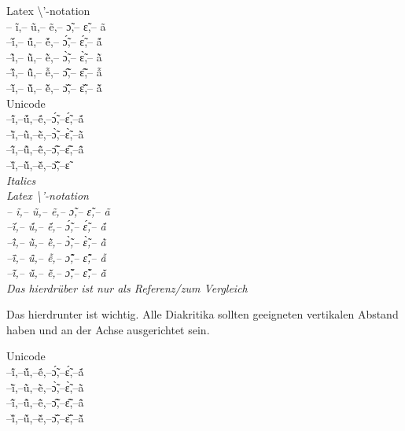Latex \textbackslash{}'-notation\\
\noindent
-- ĩ,-- ũ,-- ẽ,-- ɔ̃,-- ɛ̃,-- ã\\
--\'{ĩ},-- \'{ũ},-- \'{ẽ},-- \'{ɔ̃},-- \'{ɛ̃},-- \'{ã}\\
--\`{ĩ},-- \`{ũ},-- \`{ẽ},-- \`{ɔ̃},-- \`{ɛ̃},-- \`{ã}\\
--\^{ĩ},-- \^{ũ},-- \^{ẽ},-- \^{ɔ̃},-- \^{ɛ̃},-- \^{ã}\\
--\v{ĩ},-- \v{ũ},-- \v{ẽ},-- \v{ɔ̃},-- \v{ɛ̃},-- \v{ã}\\
%
Unicode\\
--ĩ́,--ṹ,--ẽ́,--ɔ̃́,--ɛ̃́,--ã́\\
--ĩ̀,--ũ̀,--ẽ̀,--ɔ̃̀,--ɛ̃̀,--ã̀\\
--ĩ̂,--ũ̂,--ẽ̂,--ɔ̃̂,--ɛ̃̂,--ã̂\\
--ĩ̌,--ũ̌,--ẽ̌,--ɔ̃̌,--ɛ̃\\
%
\itshape
Italics\\
Latex \textbackslash{}'-notation\\
-- ĩ,-- ũ,-- ẽ,-- ɔ̃,-- ɛ̃,-- ã\\
--\'{ĩ},-- \'{ũ},-- \'{ẽ},-- \'{ɔ̃},-- \'{ɛ̃},-- \'{ã}\\
--\`{ĩ},-- \`{ũ},-- \`{ẽ},-- \`{ɔ̃},-- \`{ɛ̃},-- \`{ã}\\
--\^{ĩ},-- \^{ũ},-- \^{ẽ},-- \^{ɔ̃},-- \^{ɛ̃},-- \^{ã}\\
--\v{ĩ},-- \v{ũ},-- \v{ẽ},-- \v{ɔ̃},-- \v{ɛ̃},-- \v{ã}\\
%

Das hierdrüber ist nur als Referenz/zum Vergleich

Das hierdrunter ist wichtig. Alle Diakritika sollten geeigneten vertikalen Abstand haben und an der Achse ausgerichtet sein. 

Unicode\\
\noindent
--ĩ́,--ṹ,--ẽ́,--ɔ̃́,--ɛ̃́,--ã́\\
--ĩ̀,--ũ̀,--ẽ̀,--ɔ̃̀,--ɛ̃̀,--ã̀\\
--ĩ̂,--ũ̂,--ẽ̂,--ɔ̃̂,--ɛ̃̂,--ã̂\\
--ĩ̌,--ũ̌,--ẽ̌,--ɔ̃̌,--ɛ̃̌,--ã̌\\